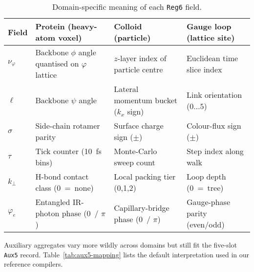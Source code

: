 \documentclass[11pt,a4paper]{article}
\begin{document}
\begin{table}[htbp]
\centering
\caption{Domain-specific meaning of each \texttt{Reg6} field.}
\label{tab:reg6-mapping}
\renewcommand{\arraystretch}{1.3}
\begin{tabular}{l p{3.2cm} p{3.2cm} p{3.2cm}}
\toprule
\textbf{Field} &
\textbf{Protein} \newline (heavy-atom voxel) &
\textbf{Colloid} \newline (particle) &
\textbf{Gauge loop} \newline (lattice site) \\
\midrule
$\nu_{\varphi}$ &
Backbone $\phi$ angle quantised on $\varphi$ lattice &
$z$-layer index of particle centre &
Euclidean time slice index \\
$\ell$ &
Backbone $\psi$ angle &
Lateral momentum bucket ($k_x$ sign) &
Link orientation ($0\dots 5$) \\
$\sigma$ &
Side-chain rotamer parity &
Surface charge sign ($\pm$) &
Colour-flux sign ($\pm$) \\
$\tau$ &
Tick counter (10~fs bins) &
Monte-Carlo sweep count &
Step index along walk \\
$k_{\perp}$ &
H-bond contact class (0~=~none) &
Local packing tier (0,1,2) &
Loop depth (0~=~tree) \\
$\varphi_{e}$ &
Entangled IR-photon phase (0~/ $\pi$) &
Capillary-bridge phase (0~/ $\pi$) &
Gauge-phase parity (even/odd) \\
\bottomrule
\end{tabular}
\end{table}

\vspace{1ex}
\noindent
Auxiliary aggregates vary more wildly across domains but still fit the
five-slot \texttt{Aux5} record.  Table~\ref{tab:aux5-mapping} lists the
default interpretation used in our reference compilers.
\end{document}
